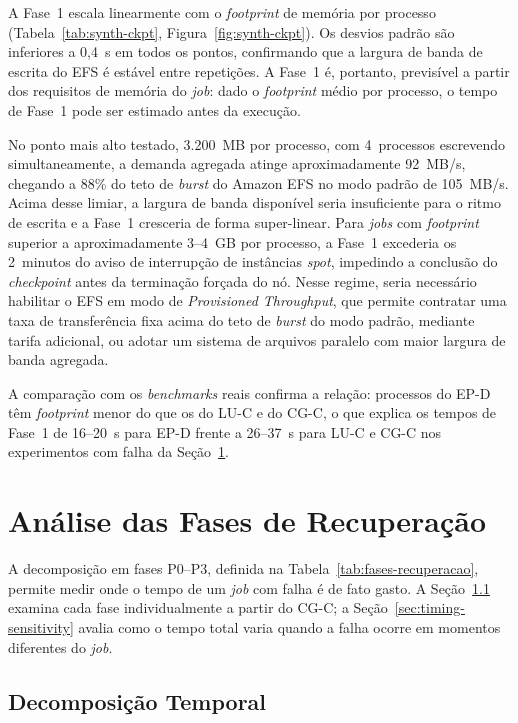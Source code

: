 A Fase~1 escala linearmente com o \textit{footprint} de memória por processo
(Tabela~\ref{tab:synth-ckpt}, Figura~\ref{fig:synth-ckpt}). Os desvios padrão são
inferiores a 0,4~s em todos os pontos, confirmando que a largura de banda de escrita
do EFS é estável entre repetições. A Fase~1 é, portanto, previsível a partir dos
requisitos de memória do \textit{job}: dado o \textit{footprint} médio por processo,
o tempo de Fase~1 pode ser estimado antes da execução.

No ponto mais alto testado, 3.200~MB por processo, com 4~processos escrevendo
simultaneamente, a demanda agregada atinge aproximadamente 92~MB/s, chegando a 88\%
do teto de \textit{burst} do Amazon EFS no modo padrão de 105~MB/s. Acima desse
limiar, a largura de banda disponível seria insuficiente para o ritmo de escrita e a
Fase~1 cresceria de forma super-linear. Para \textit{jobs} com \textit{footprint}
superior a aproximadamente 3--4~GB por processo, a Fase~1 excederia os 2~minutos do
aviso de interrupção de instâncias \textit{spot}, impedindo a conclusão do
\textit{checkpoint} antes da terminação forçada do nó. Nesse regime, seria necessário
habilitar o EFS em modo de \textit{Provisioned Throughput}, que permite contratar uma
taxa de transferência fixa acima do teto de \textit{burst} do modo padrão, mediante
tarifa adicional, ou adotar um sistema de arquivos paralelo com maior largura de banda
agregada.

A comparação com os \textit{benchmarks} reais confirma a relação: processos do EP-D
têm \textit{footprint} menor do que os do LU-C e do CG-C, o que explica os tempos
de Fase~1 de 16--20~s para EP-D frente a 26--37~s para LU-C e CG-C nos experimentos
com falha da Seção~\ref{sec:fases-recuperacao}.

\section{Análise das Fases de Recuperação}
\label{sec:fases-recuperacao}

A decomposição em fases P0--P3, definida na Tabela~\ref{tab:fases-recuperacao},
permite medir onde o tempo de um \textit{job} com falha é de fato gasto. A
Seção~\ref{sec:decomposicao} examina cada fase individualmente a partir do CG-C;
a Seção~\ref{sec:timing-sensitivity} avalia como o tempo total varia quando a
falha ocorre em momentos diferentes do \textit{job}.

\subsection{Decomposição Temporal}
\label{sec:decomposicao}

